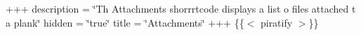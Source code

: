 +++ description = \char`\"{}\+Th\textquotesingle{} Attachments shorrrtcode displays a list o\textquotesingle{} files attached t\textquotesingle{} a plank\char`\"{} hidden = \char`\"{}true\char`\"{} title = \char`\"{}\+Attachments\char`\"{} +++ \{\{$<$ piratify $>$\}\} 